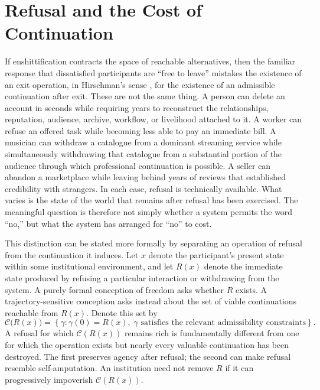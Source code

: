 \documentclass[11pt]{article}
\begin{document}
\section{Refusal and the Cost of Continuation}

If enshittification contracts the space of reachable alternatives, then the familiar response that dissatisfied participants are ``free to leave'' mistakes the existence of an exit operation, in Hirschman's sense \parencite{hirschman1970exit}, for the existence of an admissible continuation after exit. These are not the same thing. A person can delete an account in seconds while requiring years to reconstruct the relationships, reputation, audience, archive, workflow, or livelihood attached to it. A worker can refuse an offered task while becoming less able to pay an immediate bill. A musician can withdraw a catalogue from a dominant streaming service while simultaneously withdrawing that catalogue from a substantial portion of the audience through which professional continuation is possible. A seller can abandon a marketplace while leaving behind years of reviews that established credibility with strangers. In each case, refusal is technically available. What varies is the state of the world that remains after refusal has been exercised. The meaningful question is therefore not simply whether a system permits the word ``no,'' but what the system has arranged for ``no'' to cost.

This distinction can be stated more formally by separating an operation of refusal from the continuation it induces. Let \(x\) denote the participant's present state within some institutional environment, and let \(R(x)\) denote the immediate state produced by refusing a particular interaction or withdrawing from the system. A purely formal conception of freedom asks whether \(R\) exists. A trajectory-sensitive conception asks instead about the set of viable continuations reachable from \(R(x)\). Denote this set by
\[
\mathcal{C}\bigl(R(x)\bigr)
=
\left\{
\gamma :
\gamma(0)=R(x),\;
\gamma \text{ satisfies the relevant admissibility constraints}
\right\}.
\]
A refusal for which \(\mathcal{C}(R(x))\) remains rich is fundamentally different from one for which the operation exists but nearly every valuable continuation has been destroyed. The first preserves agency after refusal; the second can make refusal resemble self-amputation. An institution need not remove \(R\) if it can progressively impoverish \(\mathcal{C}(R(x))\).
\end{document}

